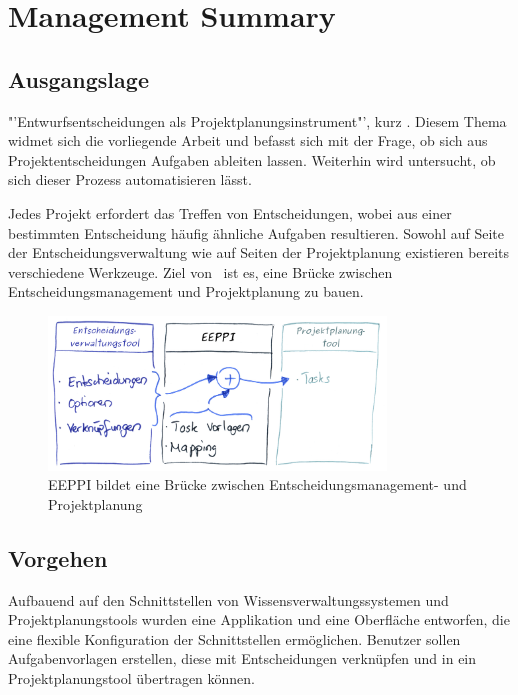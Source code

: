 \chapter{Management Summary}
	\captionsetup[figure]{labelformat=empty} %

	
	\section{Ausgangslage}
	
	"'Entwurfsentscheidungen als Projektplanungsinstrument"', kurz \eeppi. 
	Diesem Thema widmet sich die vorliegende Arbeit und befasst sich mit der Frage, 
	ob sich aus Projektentscheidungen Aufgaben ableiten lassen. 
	Weiterhin wird untersucht, ob sich dieser Prozess automatisieren lässt. 

	Jedes Projekt erfordert das Treffen von Entscheidungen, 
	wobei aus einer bestimmten Entscheidung häufig ähnliche Aufgaben resultieren. 
	Sowohl auf Seite der Entscheidungsverwaltung wie auf Seiten der Projektplanung existieren bereits verschiedene Werkzeuge. 
	Ziel von \eeppi\ ist es, eine Brücke zwischen Entscheidungsmanagement und Projektplanung zu bauen.
	
	\begin{figure}[H]
		\includegraphics[width=0.8\textwidth]{introduction/img/eeppiVision.png}
		\centering
		\caption{EEPPI bildet eine Brücke zwischen Entscheidungsmanagement- und Projektplanung}
		\label{fig:eeppiBridgeBetweenDecisionsAndTasks}
	\end{figure}
	
	
	\section{Vorgehen}
	
	Aufbauend auf den Schnittstellen von Wissensverwaltungssystemen und Projektplanungstools wurden eine Applikation und eine Oberfläche entworfen, 
	die eine flexible Konfiguration der Schnittstellen ermöglichen. 
	Benutzer sollen Aufgabenvorlagen erstellen, diese mit Entscheidungen verknüpfen und in ein Projektplanungstool übertragen können. 

